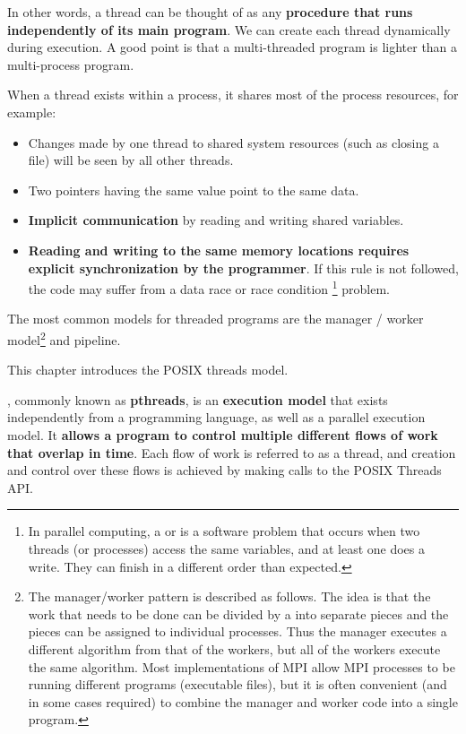 \noindent
In other words, a thread can be thought of as any \textbf{procedure that runs independently of its main program}. We can create each thread dynamically during execution. A good point is that a multi-threaded program is lighter than a multi-process program.

\newpage
\noindent
When a thread exists within a process, it shares most of the process resources, for example:
\begin{itemize}
    \item Changes made by one thread to shared system resources (such as closing a file) will be seen by all other threads.
    \item Two pointers having the same value point to the same data.
    \item \textbf{Implicit communication} by reading and writing shared variables.
    \item \textbf{Reading and writing to the same memory locations requires explicit synchronization by the programmer}. If this rule is not followed, the code may suffer from a data race or race condition \footnote{In parallel computing, a  or  is a software problem that occurs when two threads (or processes) access the same variables, and at least one does a write. They can finish in a different order than expected.} problem.
\end{itemize}
The most common models for threaded programs are the manager / worker model\footnote{The manager/worker pattern is described as follows. The idea is that the work that needs to be done can be divided by a  into separate pieces and the pieces can be assigned to individual  processes. Thus the manager executes a different algorithm from that of the workers, but all of the workers execute the same algorithm. Most implementations of MPI allow MPI processes to be running different programs (executable files), but it is often convenient (and in some cases required) to combine the manager and worker code into a single program.} and pipeline.

\highspace
This chapter introduces the POSIX threads model.
\begin{definitionbox}[: pthreads]
    , commonly known as \textbf{pthreads}, is an \textbf{execution model} that exists independently from a programming language, as well as a parallel execution model. It \textbf{allows a program to control multiple different flows of work that overlap in time}. Each flow of work is referred to as a thread, and creation and control over these flows is achieved by making calls to the POSIX Threads API.
\end{definitionbox}

